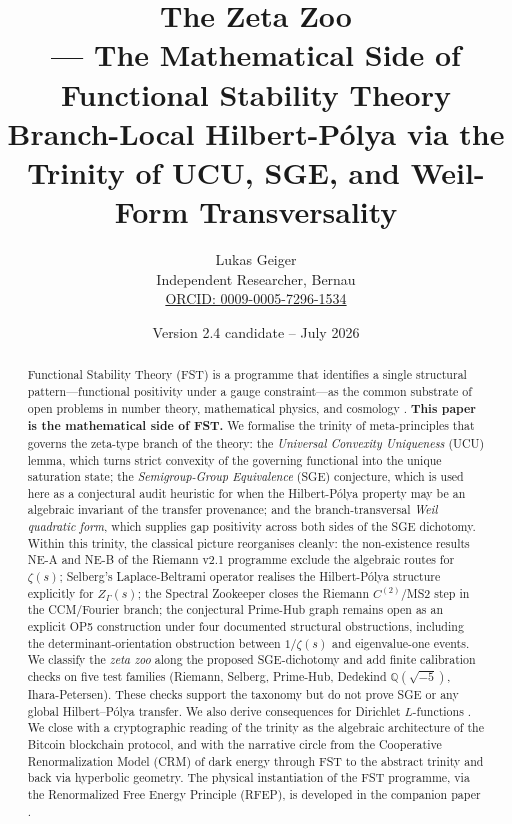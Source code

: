 \documentclass[11pt]{article}
\title{The Zeta Zoo\\
  \large --- The Mathematical Side of\\
  Functional Stability Theory\\[0.3em]
  \normalsize Branch-Local Hilbert-P\'olya via the Trinity
  of UCU, SGE, and Weil-Form Transversality}
\author{Lukas Geiger\\
  \small Independent Researcher, Bernau\\
  \small \href{https://orcid.org/0009-0005-7296-1534}{ORCID: 0009-0005-7296-1534}}
\date{Version 2.4 candidate -- July 2026}
\theoremstyle{definition}
\theoremstyle{remark}
\begin{document}
\maketitle

\begin{abstract}
\noindent
Functional Stability Theory (FST) is a programme that identifies a
single structural pattern---functional positivity under a gauge
constraint---as the common substrate of open problems in number
theory, mathematical physics, and cosmology \cite{RFEPFramework}.
\textbf{This paper is the mathematical side of FST.} We formalise
the trinity of meta-principles that governs the zeta-type branch of
the theory: the \emph{Universal Convexity Uniqueness} (UCU) lemma,
which turns strict convexity of the governing functional into the
unique saturation state; the \emph{Semigroup-Group Equivalence}
(SGE) conjecture, which is used here as a conjectural audit heuristic
for when the Hilbert-P\'olya property may be an algebraic invariant of
the transfer provenance; and the
branch-transversal \emph{Weil quadratic form}, which supplies gap
positivity across both sides of the SGE dichotomy. Within this
trinity, the classical picture reorganises cleanly: the
non-existence results NE-A and NE-B of the Riemann v2.1 programme
\cite{Geiger2026RHII} exclude the algebraic routes for $\zeta(s)$;
Selberg's Laplace-Beltrami operator realises the Hilbert-P\'olya
structure explicitly for $Z_\Gamma(s)$; the Spectral Zookeeper
\cite{Zookeeper2026} closes the Riemann $C^{(2)}$/MS2 step in the
CCM/Fourier branch; the conjectural Prime-Hub graph remains open as
an explicit OP5 construction under four documented structural
obstructions, including the determinant-orientation obstruction
between $1/\zeta(s)$ and eigenvalue-one events.
We classify the \emph{zeta zoo} along the proposed SGE-dichotomy and add finite
calibration checks on five test families (Riemann, Selberg, Prime-Hub,
Dedekind $\mathbb{Q}(\sqrt{-5})$, Ihara-Petersen). These checks support
the taxonomy but do not prove SGE or any global Hilbert--P\'olya
transfer. We also derive
consequences for Dirichlet $L$-functions
\cite{PaleyWienerDirichlet, DirichletAtlas}. We close with a
cryptographic reading of the trinity as the algebraic architecture
of the Bitcoin blockchain protocol, and with the narrative circle
from the Cooperative Renormalization Model (CRM) of dark energy
through FST to the abstract trinity and back via hyperbolic
geometry. The physical instantiation of the FST programme, via the
Renormalized Free Energy Principle (RFEP), is developed in the
companion paper \cite{RFEPFramework}.
\end{abstract}
\end{document}
